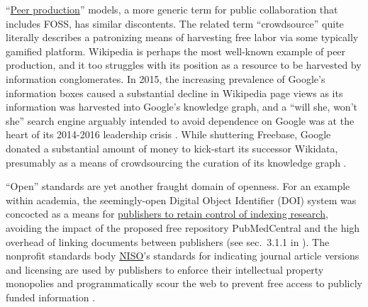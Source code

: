 \documentclass{article}
\begin{document}
``\href{https://en.wikipedia.org/wiki/Peer_production}{Peer
production}'' models, a more generic term for public collaboration that
includes FOSS, has similar discontents. The related term
``crowdsource'' quite literally
describes a patronizing means of harvesting free labor via some
typically gamified platform. Wikipedia is perhaps the most well-known
example of peer production,
and it too struggles with its position as a resource to be harvested by
information conglomerates. In 2015, the increasing prevalence of
Google's information boxes caused a substantial decline in Wikipedia
page views \cite{UserTalkJimbo2015, hinkisGoogleSteals5502015}  as
its information was harvested into Google's knowledge graph, and a
``will she, won't she'' search engine arguably intended to avoid
dependence on Google was at the heart of its 2014-2016 leadership crisis
\cite{whiteWikimediaTimelineEvents2016, buetlerSearchDestroyKnowledge2016} . While shuttering Freebase,
Google donated a substantial amount of money to kick-start its successor
\cite{pellissiertanonFreebaseWikidataGreat2016}  Wikidata,
presumably as a means of crowdsourcing the curation of its knowledge
graph \cite{wikimediameta-wikiGoogleMeta, GoogleStakeWikidata2019, vrandecicWikidataFreeCollaborative2014} .

``Open'' standards are yet another fraught domain of openness. For an
example within academia, the seemingly-open Digital Object Identifier
(DOI) system was concocted as a means for
\href{https://jon-e.net/infrastructure/\#seemingly-prosocial-protocols-can-be-used-by-industries-to-preem}{publishers
to retain control of indexing research}, avoiding the impact of the
proposed free repository PubMedCentral and the high overhead of linking
documents between publishers (see sec.~3.1.1 in \cite{saundersDecentralizedInfrastructureNeuro2022} ). The nonprofit
standards body \href{https://www.niso.org}{NISO}'s standards for
indicating journal article versions \cite{nisoRP82008JournalArticle2008}  and licensing \cite{nisoRP222021AccessLicense2021}  are used by publishers to enforce
their intellectual property monopolies and programmatically scour the
web to prevent free access to publicly funded information \cite{carpenterNewArticleSharing2021} .
\end{document}
